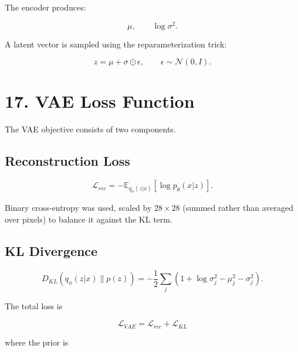 \documentclass[10pt]{article}
\begin{document}
The encoder produces:

\[
\mu,\qquad \log\sigma^2.
\]

A latent vector is sampled using the reparameterization trick:

\[
z=\mu+\sigma\odot\epsilon,
\qquad
\epsilon\sim\mathcal{N}(0,I).
\]

\begin{center}
\end{center}

\section*{17. VAE Loss Function}

The VAE objective consists of two components.

\subsection*{Reconstruction Loss}

\[
\mathcal{L}_{rec}
=
-\mathbb{E}_{q_{\phi}(z|x)}
[\log p_{\theta}(x|z)].
\]

Binary cross-entropy was used, scaled by $28\times28$ (summed rather than
averaged over pixels) to balance it against the KL term.

\subsection*{KL Divergence}

\[
D_{KL}
\left(
q_{\phi}(z|x)\parallel p(z)
\right)
=
-\frac{1}{2}
\sum_j
\left(
1+\log\sigma_j^2-\mu_j^2-\sigma_j^2
\right).
\]

The total loss is

\[
\boxed{
\mathcal{L}_{VAE}
=
\mathcal{L}_{rec}
+
\mathcal{L}_{KL}
}
\]

where the prior is
\end{document}
